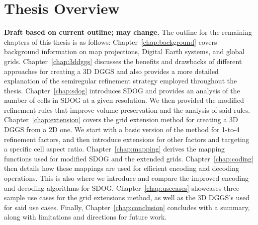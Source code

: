\section{Thesis Overview}
\textbf{Draft based on current outline; may change.}
The outline for the remaining chapters of this thesis is as follows:
Chapter~\ref{chap:background} covers background information on map projections, Digital Earth systems, and global grids.
Chapter~\ref{chap:3ddggs} discusses the benefits and drawbacks of different approaches for creating a 3D DGGS and also provides a more detailed explanation of the semiregular refinement strategy employed throughout the thesis.
Chapter~\ref{chap:sdog} introduces SDOG and provides an analysis of the number of cells in SDOG at a given resolution.
We then provided the modified refinement rules that improve volume preservation and the analysis of said rules.
Chapter~\ref{chap:extension} covers the grid extension method for creating a 3D DGGS from a 2D one.
We start with a basic version of the method for 1-to-4 refinement factors, and then introduce extensions for other factors and targeting a specific cell aspect ratio.
Chapter~\ref{chap:mapping} derives the mapping functions used for modified SDOG and the extended grids.
Chapter~\ref{chap:coding} then details how these mappings are used for efficient encoding and decoding operations.
This is also where we introduce and compare the improved encoding and decoding algorithms for SDOG.
Chapter~\ref{chap:usecases} showcases three sample use cases for the grid extensions method, as well as the 3D DGGS's used for said use cases.
Finally, Chapter~\ref{chap:conclusion} concludes with a summary, along with limitations and directions for future work.
